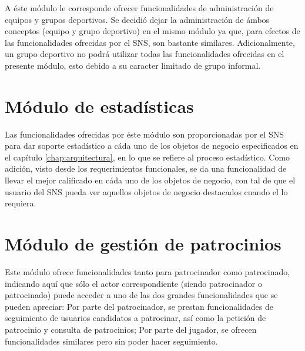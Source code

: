 %

A éste módulo le corresponde ofrecer funcionalidades de administración de equipos y grupos deportivos. Se decidió dejar la administración de ámbos conceptos (equipo y grupo deportivo) en el mismo módulo ya que, para efectos de las funcionalidades ofrecidas por el SNS, son bastante similares. Adicionalmente, un grupo deportivo no podrá utilizar todas las funcionalidades ofrecidas en el presente módulo, esto debido a su caracter limitado de grupo informal.



\section{Módulo de estadísticas}

%

Las funcionalidades ofrecidas por éste módulo son proporcionadas por el SNS para dar soporte estadístico a cáda uno de los objetos de negocio especificados en el capítulo \ref{chap:arquitectura}, en lo que se refiere al proceso estadístico. Como adición, visto desde los requerimientos funcionales, se da una funcionalidad de llevar el mejor calificado en cáda uno de los objetos de negocio, con tal de que el usuario del SNS pueda ver aquellos objetos de negocio destacados cuando el lo requiera.



\section{Módulo de gestión de patrocinios}

%

Este módulo ofrece funcionalidades tanto para patrocinador como patrocinado, indicando aquí que sólo el actor correspondiente (siendo patrocinador o patrocinado) puede acceder a uno de las dos grandes funcionalidades que se pueden apreciar: Por parte del patrocinador, se prestan funcionalidades de seguimiento de usuarios candidatos a patrocinar, así como la petición de patrocinio y consulta de patrocinios; Por parte del jugador, se ofrecen funcionalidades similares pero sin poder hacer seguimiento.

